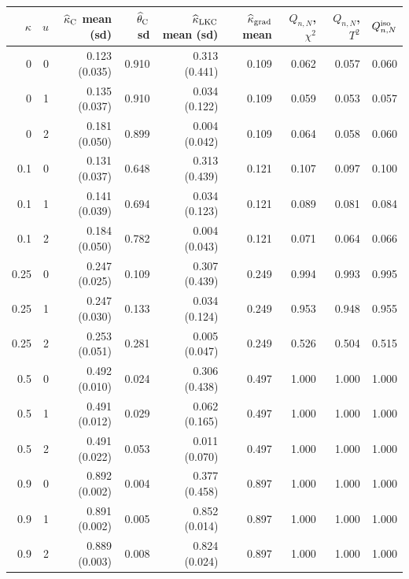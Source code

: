 \begin{tabular}{rrrrrrrrr}
\hline
$\kappa$ & $u$ & $\widehat\kappa_{\rm C}$ mean (sd) & $\widehat\theta_{\rm C}$ sd & $\widehat\kappa_{\rm LKC}$ mean (sd) & $\widehat\kappa_{\rm grad}$ mean & $Q_{n,N}$, $\chi^2$ & $Q_{n,N}$, $T^2$ & $Q^{\rm iso}_{n,N}$ \\
\hline
0 & 0 & 0.123 (0.035) & 0.910 & 0.313 (0.441) & 0.109 & 0.062 & 0.057 & 0.060 \\
0 & 1 & 0.135 (0.037) & 0.910 & 0.034 (0.122) & 0.109 & 0.059 & 0.053 & 0.057 \\
0 & 2 & 0.181 (0.050) & 0.899 & 0.004 (0.042) & 0.109 & 0.064 & 0.058 & 0.060 \\
0.1 & 0 & 0.131 (0.037) & 0.648 & 0.313 (0.439) & 0.121 & 0.107 & 0.097 & 0.100 \\
0.1 & 1 & 0.141 (0.039) & 0.694 & 0.034 (0.123) & 0.121 & 0.089 & 0.081 & 0.084 \\
0.1 & 2 & 0.184 (0.050) & 0.782 & 0.004 (0.043) & 0.121 & 0.071 & 0.064 & 0.066 \\
0.25 & 0 & 0.247 (0.025) & 0.109 & 0.307 (0.439) & 0.249 & 0.994 & 0.993 & 0.995 \\
0.25 & 1 & 0.247 (0.030) & 0.133 & 0.034 (0.124) & 0.249 & 0.953 & 0.948 & 0.955 \\
0.25 & 2 & 0.253 (0.051) & 0.281 & 0.005 (0.047) & 0.249 & 0.526 & 0.504 & 0.515 \\
0.5 & 0 & 0.492 (0.010) & 0.024 & 0.306 (0.438) & 0.497 & 1.000 & 1.000 & 1.000 \\
0.5 & 1 & 0.491 (0.012) & 0.029 & 0.062 (0.165) & 0.497 & 1.000 & 1.000 & 1.000 \\
0.5 & 2 & 0.491 (0.022) & 0.053 & 0.011 (0.070) & 0.497 & 1.000 & 1.000 & 1.000 \\
0.9 & 0 & 0.892 (0.002) & 0.004 & 0.377 (0.458) & 0.897 & 1.000 & 1.000 & 1.000 \\
0.9 & 1 & 0.891 (0.002) & 0.005 & 0.852 (0.014) & 0.897 & 1.000 & 1.000 & 1.000 \\
0.9 & 2 & 0.889 (0.003) & 0.008 & 0.824 (0.024) & 0.897 & 1.000 & 1.000 & 1.000 \\
\hline
\end{tabular}
